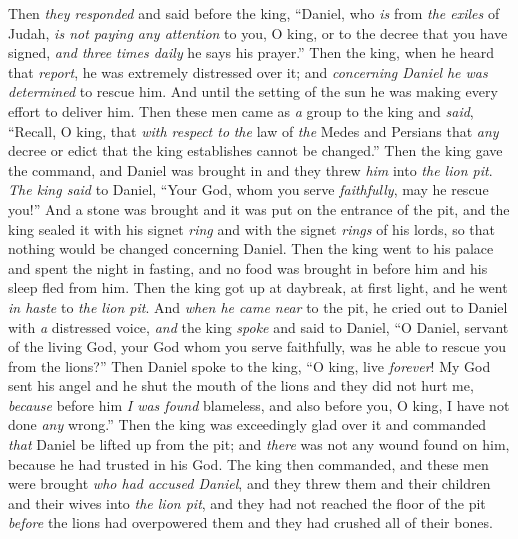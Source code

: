 \begin{biblechapter}
 Then \textit{they responded} and said before the king, “Daniel, who \textit{is} from \textit{the exiles} of Judah, \textit{is not paying any attention} to you, O king, or to the decree that you have signed, \textit{and three times daily} he says his prayer.”
\verse Then the king, when he heard that \textit{report}, he was extremely distressed over it; and \textit{concerning Daniel} \textit{he was determined} to rescue him. And until the setting of the sun he was making every effort to deliver him.
\verse Then these men came as \textit{a} group to the king and \textit{said}, “Recall, O king, that \textit{with respect to} \textit{the} law of \textit{the} Medes and Persians that \textit{any} decree or edict that the king establishes cannot be changed.”
\verse Then the king gave the command, and Daniel was brought in and they threw \textit{him} into \textit{the lion pit}. \textit{The king said} to Daniel, “Your God, whom you serve \textit{faithfully}, may he rescue you!”
\verse And a stone was brought and it was put on the entrance of the pit, and the king sealed it with his signet \textit{ring} and with the signet \textit{rings} of his lords, so that nothing would be changed concerning Daniel.
\verse Then the king went to his palace and spent the night in fasting, and no food was brought in before him and his sleep fled from him.
\verse Then the king got up at daybreak, at first light, and he went \textit{in haste} to \textit{the lion pit}.
\verse And \textit{when he came near} to the pit, he cried out to Daniel with \textit{a} distressed voice, \textit{and} the king \textit{spoke} and said to Daniel, “O Daniel, servant of the living God, your God whom you serve faithfully, was he able to rescue you from the lions?”
\verse Then Daniel spoke to the king, “O king, live \textit{forever}!
\verse My God sent his angel and he shut the mouth of the lions and they did not hurt me, \textit{because} before him \textit{I was found} blameless, and also before you, O king, I have not done \textit{any} wrong.”
\verse Then the king was exceedingly glad over it and commanded \textit{that} Daniel be lifted up from the pit; and \textit{there} was not any wound found on him, because he had trusted in his God.
\verse The king then commanded, and these men were brought \textit{who had accused Daniel}, and they threw them and their children and their wives into \textit{the lion pit}, and they had not reached the floor of the pit \textit{before} the lions had overpowered them and they had crushed all of their bones.

\end{biblechapter}
